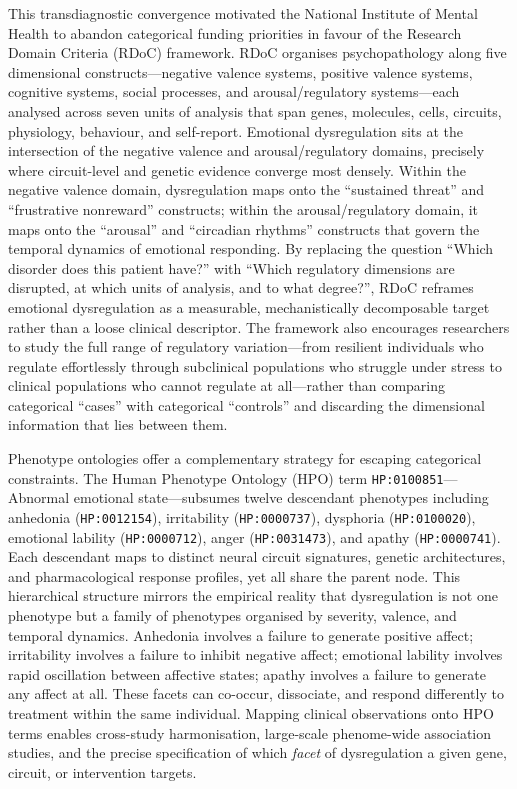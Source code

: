 This transdiagnostic convergence motivated the National Institute of Mental
Health to abandon categorical funding priorities in favour of the Research
Domain Criteria (RDoC) framework.\cite{insel2010}  RDoC organises psychopathology
along five dimensional constructs---negative valence systems, positive
valence systems, cognitive systems, social processes, and
arousal/regulatory systems---each analysed across seven units of analysis
that span genes, molecules, cells, circuits, physiology, behaviour, and
self-report.  Emotional dysregulation sits at the intersection of the
negative valence and arousal/regulatory domains, precisely where
circuit-level and genetic evidence converge most densely.  Within the
negative valence domain, dysregulation maps onto the ``sustained threat''
and ``frustrative nonreward'' constructs; within the arousal/regulatory
domain, it maps onto the ``arousal'' and ``circadian rhythms'' constructs
that govern the temporal dynamics of emotional responding.  By replacing
the question ``Which disorder does this patient have?'' with ``Which
regulatory dimensions are disrupted, at which units of analysis, and to
what degree?'', RDoC reframes emotional dysregulation as a measurable,
mechanistically decomposable target rather than a loose clinical
descriptor.  The framework also encourages researchers to study the full
range of regulatory variation---from resilient individuals who regulate
effortlessly through subclinical populations who struggle under stress to
clinical populations who cannot regulate at all---rather than comparing
categorical ``cases'' with categorical ``controls'' and discarding the
dimensional information that lies between them.

Phenotype ontologies offer a complementary strategy for escaping categorical
constraints.  The Human Phenotype Ontology (HPO) term
\texttt{HP:0100851}---Abnormal emotional state---subsumes twelve descendant
phenotypes including anhedonia (\texttt{HP:0012154}), irritability
(\texttt{HP:0000737}), dysphoria (\texttt{HP:0100020}), emotional lability
(\texttt{HP:0000712}), anger (\texttt{HP:0031473}), and apathy
(\texttt{HP:0000741}).\cite{kohler2017}  Each descendant maps to distinct neural
circuit signatures, genetic architectures, and pharmacological response
profiles, yet all share the parent node.  This hierarchical structure
mirrors the empirical reality that dysregulation is not one phenotype but a
family of phenotypes organised by severity, valence, and temporal dynamics.
Anhedonia involves a failure to generate positive affect; irritability
involves a failure to inhibit negative affect; emotional lability involves
rapid oscillation between affective states; apathy involves a failure to
generate any affect at all.  These facets can co-occur, dissociate, and
respond differently to treatment within the same individual.  Mapping
clinical observations onto HPO terms enables cross-study harmonisation,
large-scale phenome-wide association studies, and the precise specification
of which \emph{facet} of dysregulation a given gene, circuit, or
intervention targets.

